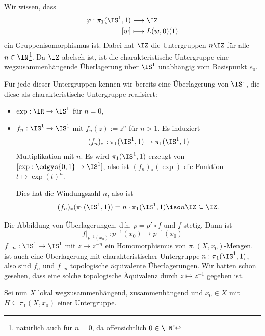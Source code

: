 \documentclass[language=ngerman]{TemplateLecture} %
\begin{document}
\begin{example}
    Wir wissen, dass 
    \begin{align*}
        \varphi: \pi_1(\IS^1, 1) &\longrightarrow \IZ \\
        [w] &\longmapsto L(w,0)(1)
    \end{align*}
    ein Gruppenisomorphismus ist. Dabei hat $\IZ$ die Untergruppen $n\IZ$ für alle $n \in \IN$\footnote{natürlich auch für $n = 0$, da offensichtlich $0 \in \IN$!}. Da $\IZ$ abelsch ist, ist die charakteristische Untergruppe eine wegzusammenhängende Überlagerung über $\IS^1$ unabhängig vom Basispunkt $e_0$.

    Für jede dieser Untergruppen kennen wir bereits eine Überlagerung von $\IS^1$, die diese als charakteristische Untergruppe realisiert:
    \begin{itemize}
        \item $\exp: \IR \to \IS^1$ für $n = 0$,
        \item $f_n: \IS^1 \to \IS^1$ mit $f_n(z) := z^n$ für $n > 1$. Es induziert 
        \begin{equation*}
            (f_n)_*: \pi_1(\IS^1, 1) \to \pi_1(\IS^1, 1)
        \end{equation*}
        Multiplikation mit $n$. Es wird $\pi_1(\IS^1, 1)$ erzeugt von $[\exp: \edgys{0,1} \to \IS^1]$, also ist $(f_n)_*(\exp)$ die Funktion $t \mapsto \exp(t)^n$.

        Dies hat die Windungszahl $n$, also ist 
        \begin{equation*}
            (f_n)_*(\pi_1(\IS^1, 1)) = n \cdot \pi_1(\IS^1, 1) \iso n\IZ \subseteq \IZ.
        \end{equation*}
    \end{itemize} 
    Die Abbildung von Überlagerungen, d.h. $p = p' \circ f$ und $f$ stetig. Dann ist 
    \begin{equation*}
        f|_{p^{-1}(x_0)} : p^{-1}(x_0) \to p^{-1}(x_0)
    \end{equation*} $f_{-n}: \IS^1 \to \IS^1$ mit $z \mapsto z^{-n}$
    ein Homomorphismus von $\pi_1(X,x_0)$-Mengen. ist auch eine Überlagerung mit charakteristischer Untergruppe $n: \pi_1(\IS^1, 1)$, also sind $f_n$ und $f_{-n}$ topologische äquivalente Überlagerungen. Wir hatten schon gesehen, dass eine solche topologische Äquivalenz durch $z \mapsto z^{-1}$ gegeben ist.
\end{example}
Sei nun $X$ lokal wegzusammenhängend, zusammenhängend und $x_0 \in X$ mit $H \subseteq \pi_1(X, x_0)$ einer Untergruppe.
\end{document}
